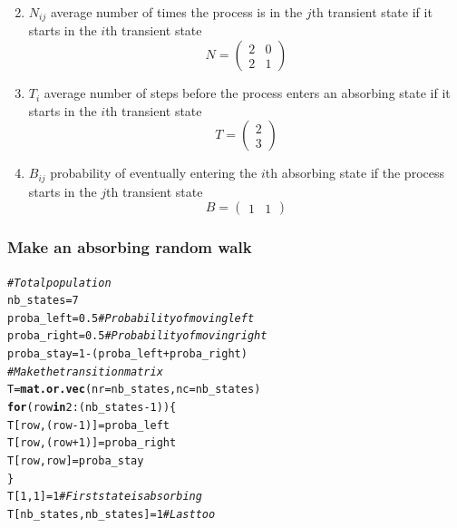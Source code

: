 \documentclass[aspectratio=169]{beamer}\usepackage[]{graphicx}\usepackage[]{xcolor}
\makeatletter
\newcommand{\hlnum}[1]{\textcolor[rgb]{0.686,0.059,0.569}{#1}}%
\newcommand{\hlcom}[1]{\textcolor[rgb]{0.678,0.584,0.686}{\textit{#1}}}%
\newcommand{\hlopt}[1]{\textcolor[rgb]{0,0,0}{#1}}%
\newcommand{\hldef}[1]{\textcolor[rgb]{0.345,0.345,0.345}{#1}}%
\newcommand{\hlkwa}[1]{\textcolor[rgb]{0.161,0.373,0.58}{\textbf{#1}}}%
\newcommand{\hlkwb}[1]{\textcolor[rgb]{0.69,0.353,0.396}{#1}}%
\newcommand{\hlkwc}[1]{\textcolor[rgb]{0.333,0.667,0.333}{#1}}%
\newcommand{\hlkwd}[1]{\textcolor[rgb]{0.737,0.353,0.396}{\textbf{#1}}}%
\newenvironment{kframe}{%
 \def\at@end@of@kframe{}%
 \ifinner\ifhmode%
  \def\at@end@of@kframe{\end{minipage}}%
  \begin{minipage}{\columnwidth}%
 \fi\fi%
 \def\FrameCommand##1{\hskip\@totalleftmargin \hskip-\fboxsep
 \colorbox{shadecolor}{##1}\hskip-\fboxsep
     \hskip-\linewidth \hskip-\@totalleftmargin \hskip\columnwidth}%
 \MakeFramed {\advance\hsize-\width
   \@totalleftmargin\z@ \linewidth\hsize
   \@setminipage}}%
 {\par\unskip\endMakeFramed%
 \at@end@of@kframe}
\newenvironment{knitrout}{}{} %
\makeatother
\begin{document}
\begin{frame}
\begin{enumerate}
\setcounter{enumi}{1}
\item $N_{ij}$ average number of times the process is in the $j$th transient state if it starts in the $i$th transient state
\[
N=
\begin{pmatrix}
2 & 0 \\
2 & 1
\end{pmatrix}
\]
\vfill
\item $T_i$ average number of steps before the process enters an absorbing state if it starts in the $i$th transient state
\[
T=\begin{pmatrix}
2\\
3
\end{pmatrix}
\]
\vfill
\item $B_{ij}$ probability of eventually entering the $i$th absorbing state if the process starts in the $j$th transient state
\[
B=
\begin{pmatrix}
	1 & 1
\end{pmatrix}
\]
\end{enumerate}
\vfill
\end{frame}

\begin{frame}[fragile]\frametitle{Make an absorbing random walk}
\begin{knitrout}
\color{fgcolor}\begin{kframe}
\begin{alltt}
\hlcom{# Total population}
\hldef{nb_states} \hlkwb{=} \hlnum{7}
\hldef{proba_left} \hlkwb{=} \hlnum{0.5}  \hlcom{# Probability of moving left}
\hldef{proba_right} \hlkwb{=} \hlnum{0.5} \hlcom{# Probability of moving right}
\hldef{proba_stay} \hlkwb{=} \hlnum{1}\hlopt{-}\hldef{(proba_left}\hlopt{+}\hldef{proba_right)}
\hlcom{# Make the transition matrix}
\hldef{T} \hlkwb{=} \hlkwd{mat.or.vec}\hldef{(}\hlkwc{nr} \hldef{= nb_states,} \hlkwc{nc} \hldef{= nb_states)}
\hlkwa{for} \hldef{(row} \hlkwa{in} \hlnum{2}\hlopt{:}\hldef{(nb_states}\hlopt{-}\hlnum{1}\hldef{)) \{}
  \hldef{T[row,(row}\hlopt{-}\hlnum{1}\hldef{)]} \hlkwb{=} \hldef{proba_left}
  \hldef{T[row,(row}\hlopt{+}\hlnum{1}\hldef{)]} \hlkwb{=} \hldef{proba_right}
  \hldef{T[row, row]} \hlkwb{=} \hldef{proba_stay}
\hldef{\}}
\hldef{T[}\hlnum{1}\hldef{,}\hlnum{1}\hldef{]} \hlkwb{=} \hlnum{1} \hlcom{# First state is absorbing}
\hldef{T[nb_states, nb_states]} \hlkwb{=} \hlnum{1} \hlcom{# Last too}
\end{alltt}
\end{kframe}
\end{knitrout}
\end{frame}
\end{document}
